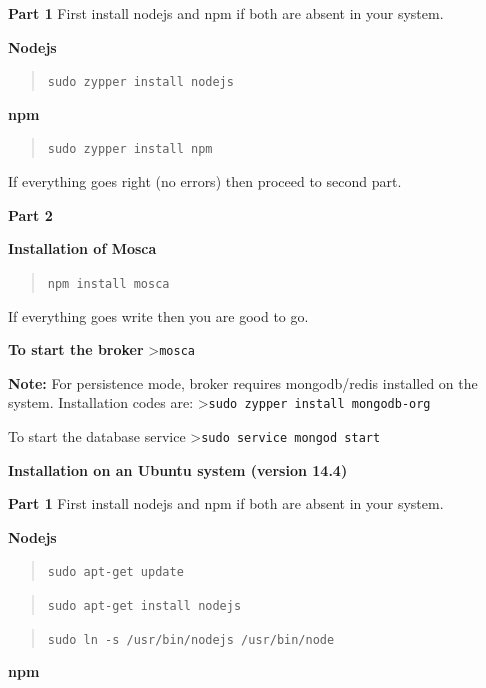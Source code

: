 \documentclass[16pt]{article}
\begin{document}
\textbf{Part 1} First install nodejs and npm if both are absent in your
system.

 
\textbf{Nodejs}

\begin{quote}
\texttt{sudo zypper install nodejs}
\end{quote}

\textbf{npm}

\begin{quote}
\texttt{sudo zypper install npm}
\end{quote}

If everything goes right (no errors) then proceed to second part.
 \vspace{0.5cm}

\textbf{Part 2}

\textbf{Installation of Mosca}

\begin{quote}
\texttt{npm install mosca}
\end{quote}

If everything goes write then you are good to go.
 \vspace{0.5cm}

\textbf{To start the broker} \textgreater{}\texttt{mosca}

\textbf{Note:} For persistence mode, broker requires mongodb/redis
installed on the system. Installation codes are:
\textgreater{}\texttt{sudo zypper install mongodb-org}

To start the database service
\textgreater{}\texttt{sudo service mongod start}
 \vspace{0.5cm}



\textbf{Installation on an Ubuntu system (version
14.4)}

\textbf{Part 1} First install nodejs and npm if both are absent in your
system.

\textbf{Nodejs}

\begin{quote}
\texttt{sudo apt-get update}
\end{quote}

\begin{quote}
\texttt{sudo apt-get install nodejs}
\end{quote}

\begin{quote}
\texttt{sudo ln -s /usr/bin/nodejs /usr/bin/node}
\end{quote}

\textbf{npm}
\end{document}
